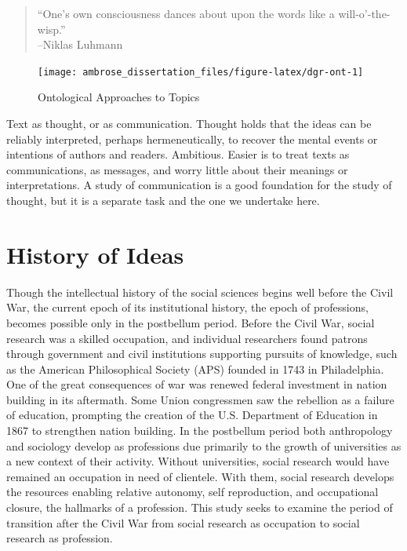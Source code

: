 \documentclass[]{book}
\begin{document}
\begin{quote}
``One's own consciousness dances about upon the words like a
will-o'-the-wisp.''\\
--Niklas Luhmann \citeyearpar[166]{Luhmann2002Theories}
\end{quote}

\begin{figure}

{\centering \texttt{[image: ambrose\_dissertation\_files/figure-latex/dgr-ont-1]} 

}

\caption{Ontological Approaches to Topics}\label{fig:dgr-ont}
\end{figure}

Text as thought, or as communication. Thought holds that the ideas can
be reliably interpreted, perhaps hermeneutically, to recover the mental
events or intentions of authors and readers. Ambitious. Easier is to
treat texts as communications, as messages, and worry little about their
meanings or interpretations. A study of communication is a good
foundation for the study of thought, but it is a separate task and the
one we undertake here.

\chapter{History of Ideas}\label{kd-problem}

Though the intellectual history of the social sciences begins well
before the Civil War, the current epoch of its institutional history,
the epoch of professions, becomes possible only in the postbellum
period. Before the Civil War, social research was a skilled occupation,
and individual researchers found patrons through government and civil
institutions supporting pursuits of knowledge, such as the American
Philosophical Society (APS) founded in 1743 in Philadelphia. One of the
great consequences of war was renewed federal investment in nation
building in its aftermath. Some Union congressmen saw the rebellion as a
failure of education, prompting the creation of the U.S. Department of
Education in 1867 to strengthen nation building. In the postbellum
period both anthropology and sociology develop as professions due
primarily to the growth of universities as a new context of their
activity. Without universities, social research would have remained an
occupation in need of clientele. With them, social research develops the
resources enabling relative autonomy, self reproduction, and
occupational closure, the hallmarks of a profession. This study seeks to
examine the period of transition after the Civil War from social
research as occupation to social research as profession.
\end{document}
